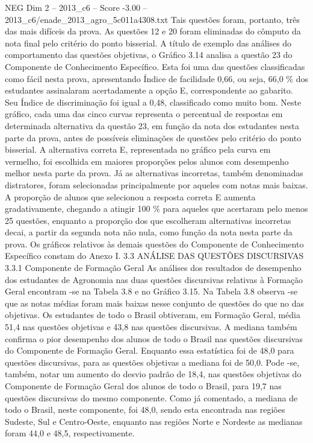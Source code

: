 \begin{textsample}{NEG Dim 2 – 2013\_c6 – Score -3.00 – 2013\_c6/enade\_2013\_agro\_5c011a4308.txt}
Tais questões foram, portanto, três das mais difíceis da prova.
As questões 12 e 20 foram eliminadas do cômputo da nota final pelo critério do ponto bisserial.
A título de exemplo das análises do comportamento das questões objetivas, o Gráfico 3.14 analisa a questão 23 do Componente de Conhecimento Específico.
Esta foi uma das questões classificadas como fácil nesta prova, apresentando Índice de facilidade 0,66, ou seja, 66,0 \% dos estudantes assinalaram acertadamente a opção E, correspondente ao gabarito.
Seu Índice de discriminação foi igual a 0,48, classificado como muito bom.
Neste gráfico, cada uma das cinco curvas representa o percentual de respostas em determinada alternativa da questão 23, em função da nota dos estudantes nesta parte da prova, antes de possíveis eliminações de questões pelo critério do ponto bisserial.
A alternativa correta E, representada no gráfico pela curva em vermelho, foi escolhida em maiores proporções pelos alunos com desempenho melhor nesta parte da prova.
Já as alternativas incorretas, também denominadas distratores, foram selecionadas principalmente por aqueles com notas mais baixas.
A proporção de alunos que selecionou a resposta correta E aumenta gradativamente, chegando a atingir 100 \% para aqueles que acertaram pelo menos 25 questões, enquanto a proporção dos que escolheram alternativas incorretas decai, a partir da segunda nota não nula, como função da nota nesta parte da prova.
Os gráficos relativos às demais questões do Componente de Conhecimento Específico constam do Anexo I. 3.3 ANÁLISE DAS QUESTÕES DISCURSIVAS 3.3.1 Componente de Formação Geral As análises dos resultados de desempenho dos estudantes de Agronomia nas duas questões discursivas relativas à Formação Geral encontram -se na Tabela 3.8 e no Gráfico 3.15.
Na Tabela 3.8 observa -se que as notas médias foram mais baixas nesse conjunto de questões do que no das objetivas.
Os estudantes de todo o Brasil obtiveram, em Formação Geral, média 51,4 nas questões objetivas e 43,8 nas questões discursivas.
A mediana também confirma o pior desempenho dos alunos de todo o Brasil nas questões discursivas do Componente de Formação Geral.
Enquanto essa estatística foi de 48,0 para questões discursivas, para as questões objetivas a mediana foi de 50,0.
Pode -se, também, notar um aumento do desvio padrão de 18,4, nas questões objetivas do Componente de Formação Geral dos alunos de todo o Brasil, para 19,7 nas questões discursivas do mesmo componente.
Como já comentado, a mediana de todo o Brasil, neste componente, foi 48,0, sendo esta encontrada nas regiões Sudeste, Sul e Centro-Oeste, enquanto nas regiões Norte e Nordeste as medianas foram 44,0 e 48,5, respectivamente.

\end{textsample}

